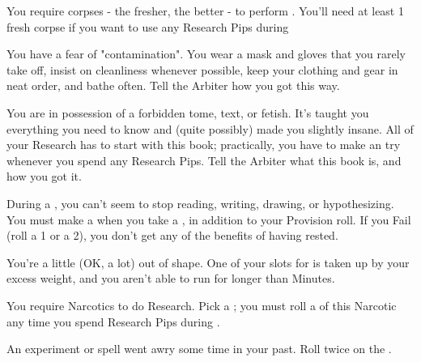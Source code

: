 \begin{multicols*}{2}
  You require corpses - the fresher, the better - to perform . You'll need at least 1 fresh corpse if you want to use any Research Pips during 


  You have a fear of "contamination". You wear a mask and gloves that you rarely take off, insist on cleanliness whenever possible, keep your clothing and gear in neat order, and bathe often. Tell the Arbiter how you got this way.

\cbreak


  You are in possession of a forbidden tome, text, or fetish. It's taught you everything you need to know and (quite possibly) made you slightly insane. All of your Research has to start with this book; practically, you have to make an  try whenever you spend any Research Pips. Tell the Arbiter what this book is, and how you got it.


  During a , you can't seem to stop reading, writing, drawing, or hypothesizing. You must make a \RSTRY{\FOC} when you take a , in addition to your Provision roll. If you Fail (roll a 1 or a 2), you don't get any of the benefits of having rested.


  You're a little (OK, a lot) out of shape. One of your slots for  is taken up by your excess weight, and you aren't able to run for longer than Minutes.



  You require Narcotics to do Research. Pick a ; you must roll a \UD of this Narcotic any time you spend Research Pips during  .


  An experiment or spell went awry some time in your past. Roll twice on the .


\end{multicols*}
